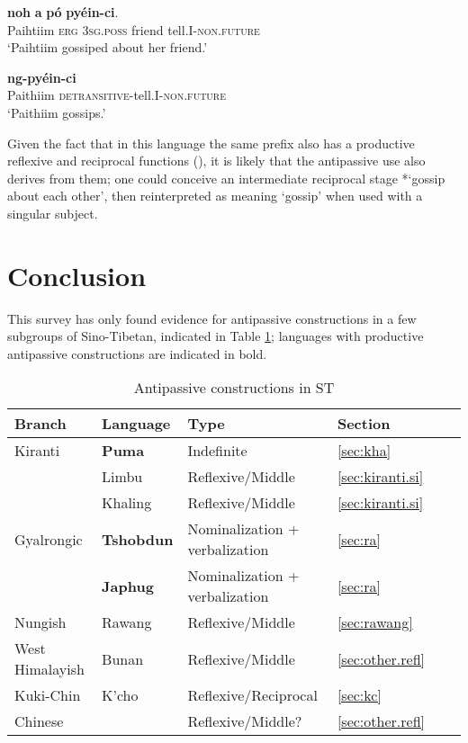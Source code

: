 \documentclass[oneside,a4paper,11pt]{article}
\newcommand{\ipa}[1]{{\phon\textbf{#1}}}
\begin{document}
\begin{exe}
\ex  \label{ex:pyeinci}
\gll  \ipa{Páihtiim} \ipa{noh} \ipa{a} \ipa{pó} \ipa{pyéin-ci}. \\
Paihtiim \textsc{erg} \textsc{3sg.poss} friend tell.I-\textsc{non.future} \\
\glt `Paihtiim gossiped about her friend.'
\end{exe}

\begin{exe}
\ex  \label{ex:ngpyeinci}
\gll  \ipa{Páithiim} \ipa{ng-pyéin-ci} \\
Paithiim \textsc{detransitive}-tell.I-\textsc{non.future} \\
\glt `Paithiim gossips.' 
\end{exe}

Given the fact that in this language the same prefix also has a productive reflexive and reciprocal functions (\citealt[55-6]{mang06kcho}), it is likely that the antipassive use also derives from them; one could conceive an intermediate reciprocal stage *`gossip about each other', then reinterpreted as meaning `gossip' when used with a singular subject.

\section{Conclusion}
This survey has only found evidence for antipassive constructions in a few subgroups of Sino-Tibetan, indicated in Table \ref{tab:summary}; languages with productive antipassive constructions are indicated in bold.

\begin{table}[h]
\caption{Antipassive constructions in ST} \label{tab:summary} \centering
\begin{tabular}{llllll}
\toprule
Branch & Language & Type & Section \\
\midrule
Kiranti & \textbf{Puma} & Indefinite & \ref{sec:kha} \\
&Limbu & Reflexive/Middle & \ref{sec:kiranti.si} \\
&Khaling & Reflexive/Middle & \ref{sec:kiranti.si} \\
Gyalrongic & \textbf{Tshobdun} & Nominalization + verbalization & \ref{sec:ra} \\
  & \textbf{Japhug} & Nominalization + verbalization&  \ref{sec:ra}   \\
  Nungish & Rawang & Reflexive/Middle & \ref{sec:rawang} \\
  West Himalayish & Bunan & Reflexive/Middle  & \ref{sec:other.refl} \\
Kuki-Chin & K'cho  & Reflexive/Reciprocal &\ref{sec:kc}\\
Chinese &   & Reflexive/Middle? & \ref{sec:other.refl} \\
\bottomrule
\end{tabular}
\end{table} 
\end{document}
